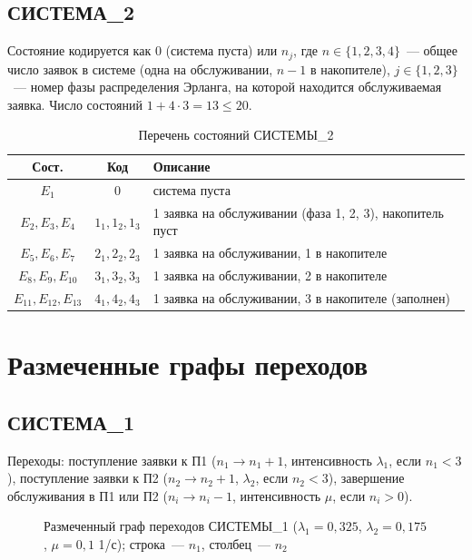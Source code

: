 \documentclass[12pt,a4paper]{article}
\begin{document}
\subsection{СИСТЕМА\_2}
Состояние кодируется как $0$ (система пуста) или $n_j$, где $n \in \{1,2,3,4\}$~--- общее число заявок в
системе (одна на обслуживании, $n-1$ в накопителе), $j\in\{1,2,3\}$~--- номер фазы распределения Эрланга,
на которой находится обслуживаемая заявка. Число состояний $1 + 4\cdot3 = 13 \le 20$.

\begin{table}[H]
\centering\small
\caption{Перечень состояний СИСТЕМЫ\_2}
\begin{tabular}{ccl}
\toprule
Сост. & Код & Описание \\
\midrule
$E_1$ & 0 & система пуста \\
$E_2,E_3,E_4$ & $1_1, 1_2, 1_3$ & 1 заявка на обслуживании (фаза 1, 2, 3), накопитель пуст \\
$E_5,E_6,E_7$ & $2_1, 2_2, 2_3$ & 1 заявка на обслуживании, 1 в накопителе \\
$E_8,E_9,E_{10}$ & $3_1, 3_2, 3_3$ & 1 заявка на обслуживании, 2 в накопителе \\
$E_{11},E_{12},E_{13}$ & $4_1, 4_2, 4_3$ & 1 заявка на обслуживании, 3 в накопителе (заполнен) \\
\bottomrule
\end{tabular}
\end{table}

\section{Размеченные графы переходов}
\subsection{СИСТЕМА\_1}
Переходы: поступление заявки к П1 ($n_1\to n_1+1$, интенсивность $\lambda_1$, если $n_1<3$),
поступление заявки к П2 ($n_2\to n_2+1$, $\lambda_2$, если $n_2<3$), завершение обслуживания
в П1 или П2 ($n_i\to n_i-1$, интенсивность $\mu$, если $n_i>0$).
\begin{figure}[H]
\centering
\resizebox{0.92\textwidth}{!}{\graphOne}
\caption{Размеченный граф переходов СИСТЕМЫ\_1 ($\lambda_1=0{,}325$, $\lambda_2=0{,}175$, $\mu=0{,}1$ 1/с); строка~--- $n_1$, столбец~--- $n_2$}
\end{figure}
\end{document}
